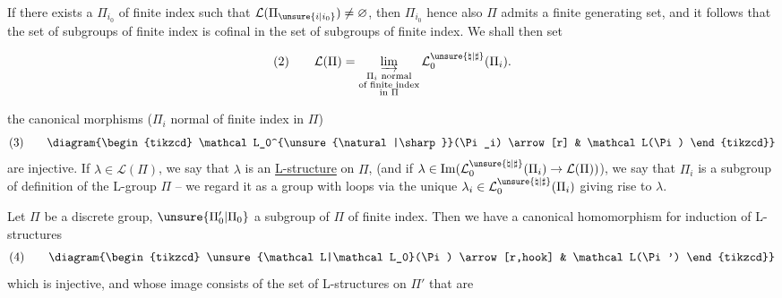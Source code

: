If there exists a $\Pi_{i_0}$ of finite index such that
$\mathcal L(\Pi_{\unsure{i|i_0}})\ne\varnothing$, then $\Pi_{i_0}$ hence also $\Pi$ admits
a finite generating set, and it follows
that the set of  subgroups of finite index
is cofinal in the set of subgroups
of finite index. We shall then set


\[
\text{(2)}\qquad
\mathcal L(\Pi)=
\varinjlim_{\substack{\Pi_i\text{ normal}\\
\text{of finite index}\\
\text{in }\Pi}}
\mathcal L_0^{\unsure{\natural|\sharp}}(\Pi_i).
\]


the canonical morphisms ($\Pi_i$ normal of finite index
in $\Pi$)
\[
\text{(3)}\qquad
\diagram{\begin{tikzcd}
\mathcal L_0^{\unsure{\natural|\sharp}}(\Pi_i) \arrow[r] & \mathcal L(\Pi)
\end{tikzcd}}
\]
are injective. If $\lambda\in\mathcal L(\Pi)$, we say that
$\lambda$ is an \uline{L-structure} on $\Pi$,
(and if
$\lambda\in\operatorname{Im}(\mathcal L_0^{\unsure{\natural|\sharp}}(\Pi_i)\to\mathcal L(\Pi))$),
we say that $\Pi_i$ is
a subgroup of definition of the L-group
$\Pi$ -- we regard it as a
group with loops via the unique $\lambda_i\in\mathcal L_0^{\unsure{\natural|\sharp}}(\Pi_i)$
giving rise to $\lambda$.

Let $\Pi$ be a discrete group, $\unsure{\Pi'_0|\Pi_0}$ a
subgroup of $\Pi$ of finite index. Then
we have a canonical homomorphism
for induction of L-structures
\[
\text{(4)}\qquad
\diagram{\begin{tikzcd}
\unsure{\mathcal L|\mathcal L_0}(\Pi) \arrow[r,hook] & \mathcal L(\Pi')
\end{tikzcd}}
\]
which is injective, and whose image consists
of the set of L-structures on $\Pi'$ that are

